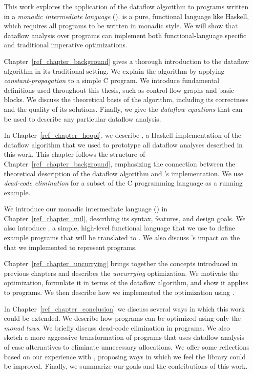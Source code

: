 This work explores the application of the dataflow algorithm to
programs written in a \emph{monadic intermediate language}
(\mil). \Mil is a pure, functional language like Haskell, which 
requires all programs to be written in monadic style.  We will show
that dataflow analysis over \mil programs can implement both
functional-language specific and traditional imperative optimizations.

 Chapter~\ref{ref_chapter_background}  gives 
a thorough introduction to the dataflow algorithm in its traditional
setting. We explain the algorithm by
applying \emph{constant-propagation} to a simple C program. We
introduce fundamental definitions used throughout this thesis, such as
control-flow graphs and basic blocks. We discuss the theoretical basis
of the algorithm, including its correctness and the quality of its
solutions. Finally, we give the \emph{dataflow equations} that can be
used to describe any particular dataflow analysis.

 In Chapter~\ref{ref_chapter_hoopl},
we describe \hoopl \citep{Hoopl-3.8.7.0}, a Haskell implementation of
the dataflow algorithm that we used to prototype all dataflow analyses
described in this work. This chapter follows the structure of
Chapter~\ref{ref_chapter_background}, emphasizing the connection
between the theoretical description of the dataflow algorithm
and \hoopl's implementation. We use \emph{dead-code elimination} for a
subset of the C programming language as a running example.

 We introduce our monadic 
intermediate language (\mil) in Chapter~\ref{ref_chapter_mil},
describing its syntax, features, and design goals. We also introduce
\lamC, a simple, high-level functional language that we use
to define example programs that will be translated to \mil. We also
discuss \hoopl's impact on the \ast that we implemented to
represent \mil programs.

 Chapter~\ref{ref_chapter_uncurrying} brings
together the concepts introduced in previous chapters and describes
the \emph{uncurrying} optimization. We motivate the optimization,
formulate it in terms of the dataflow algorithm, and show it applies
to \mil programs. We then describe how we implemented the optimization
using \hoopl.

 In Chapter~\ref{ref_chapter_conclusion} we 
discuss several ways in which this work could be extended. We describe
how \mil programs can be optimized using only the \emph{monad
laws}. We briefly discuss dead-code elimination in \mil programs. We
also sketch a more aggressive transformation of \mil programs that
uses dataflow analysis of case alternatives to eliminate unnecessary
allocations. We offer some reflections based on our experience
with \hoopl, proposing ways in which we feel the library could be
improved. Finally, we summarize our goals and the contributions of
this work.


